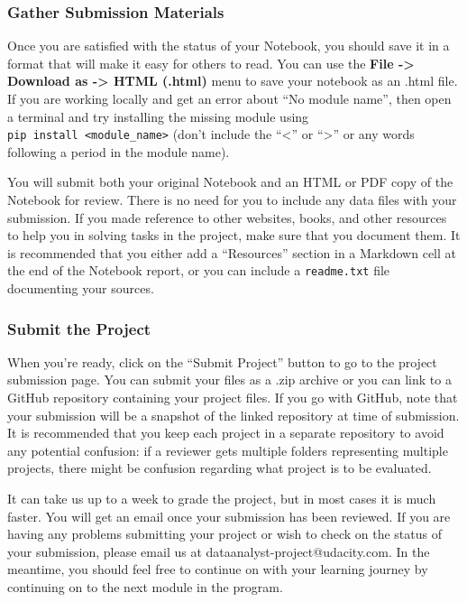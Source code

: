\documentclass[11pt]{article}
\begin{document}
\hypertarget{gather-submission-materials}{%
\subsubsection{Gather Submission
Materials}\label{gather-submission-materials}}

Once you are satisfied with the status of your Notebook, you should save
it in a format that will make it easy for others to read. You can use
the \textbf{File -\textgreater{} Download as -\textgreater{} HTML
(.html)} menu to save your notebook as an .html file. If you are working
locally and get an error about ``No module name'', then open a terminal
and try installing the missing module using
\texttt{pip\ install\ \textless{}module\_name\textgreater{}} (don't
include the ``\textless{}'' or ``\textgreater{}'' or any words following
a period in the module name).

You will submit both your original Notebook and an HTML or PDF copy of
the Notebook for review. There is no need for you to include any data
files with your submission. If you made reference to other websites,
books, and other resources to help you in solving tasks in the project,
make sure that you document them. It is recommended that you either add
a ``Resources'' section in a Markdown cell at the end of the Notebook
report, or you can include a \texttt{readme.txt} file documenting your
sources.

\hypertarget{submit-the-project}{%
\subsubsection{Submit the Project}\label{submit-the-project}}

When you're ready, click on the ``Submit Project'' button to go to the
project submission page. You can submit your files as a .zip archive or
you can link to a GitHub repository containing your project files. If
you go with GitHub, note that your submission will be a snapshot of the
linked repository at time of submission. It is recommended that you keep
each project in a separate repository to avoid any potential confusion:
if a reviewer gets multiple folders representing multiple projects,
there might be confusion regarding what project is to be evaluated.

It can take us up to a week to grade the project, but in most cases it
is much faster. You will get an email once your submission has been
reviewed. If you are having any problems submitting your project or wish
to check on the status of your submission, please email us at
dataanalyst-project@udacity.com. In the meantime, you should feel free
to continue on with your learning journey by continuing on to the next
module in the program.


    
    
    
    
\end{document}
